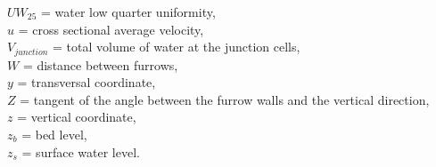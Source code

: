 \documentclass[review,authoryear]{elsarticle}
\begin{document}
$UW_{25}$ = water low quarter uniformity,\\
$u$ = cross sectional average velocity,\\
$V_{junction}$ = total volume of water at the junction cells,\\
$W$ = distance between furrows,\\
$y$ = transversal coordinate,\\
$Z$ = tangent of the angle between the furrow walls and the vertical direction,
\\
$z$ = vertical coordinate,\\
$z_b$ = bed level,\\
$z_s$ = surface water level.


\end{document}
